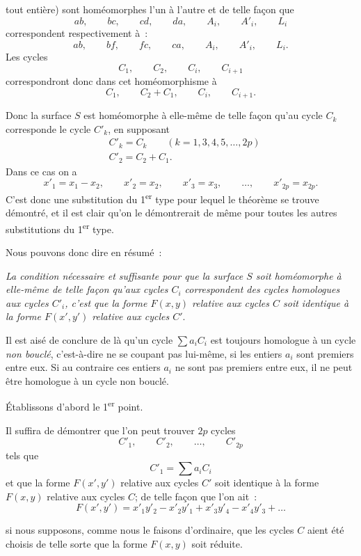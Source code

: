 \documentclass{article}
\begin{document}
tout entière) sont homéomorphes l'un à l'autre et de telle façon que
\[ ab, \qquad bc, \qquad cd, \qquad da, \qquad A_{i}, \qquad A'_{i}, \qquad L_{i} \]
correspondent respectivement à~:
\[ ab, \qquad bf, \qquad fc, \qquad ca, \qquad A_{i}, \qquad A'_{i}, \qquad L_{i}. \]
Les cycles
\[ C_{1}, \qquad C_{2}, \qquad C_{i}, \qquad C_{i+1} \]
correspondront donc dans cet homéomorphisme à
\[ C_{1}, \qquad C_{2} + C_{1}, \qquad C_{i}, \qquad C_{i+1}. \]

Donc la surface $S$ est homéomorphe à elle-même de telle façon qu'au cycle $C_{k}$ corresponde le cycle $C'_{k}$, en supposant
\[ \begin{aligned} &C'_{k} = C_{k} \qquad (k = 1, 3, 4, 5, \ldots, 2p)\\ &C'_{2} = C_{2} + C_{1}. \end{aligned} \]
Dans ce cas on a
\[ x'_{1} = x_{1} - x_{2}, \qquad x'_{2} = x_{2}, \qquad x'_{3} = x_{3}, \qquad \ldots, \qquad x'_{2p} = x_{2p}. \]
C'est donc une substitution du 1\textsuperscript{er} type pour lequel le théorème se trouve démontré, et il est clair qu'on le démontrerait de même pour toutes les autres substitutions du 1\textsuperscript{er} type.

Nous pouvons donc dire en résumé~:

\emph{La condition nécessaire et suffisante pour que la surface $S$ soit homéomorphe à elle-même de telle façon qu'aux cycles $C_{i}$ correspondent des cycles homologues aux cycles $C'_{i}$, c'est que la forme $F(x, y)$ relative aux cycles $C$ soit identique à la forme $F(x', y')$ relative aux cycles $C'$}.

Il est aisé de conclure de là qu'un cycle $\displaystyle\sum a_{i} C_{i}$ est toujours homologue à un cycle \emph{non bouclé}, c'est-à-dire ne se coupant pas lui-même, si les entiers $a_{i}$ sont premiers entre eux. Si au contraire ces entiers $a_{i}$ ne sont pas premiers entre eux, il ne peut être homologue à un cycle non bouclé.

Établissons d'abord le 1\textsuperscript{er} point.

Il suffira de démontrer que l'on peut trouver $2p$ cycles
\[ C'_{1}, \qquad C'_{2}, \qquad \ldots, \qquad C'_{2p} \]
tels que
\[ C'_{1} = \sum a_{i} C_{i} \]
et que la forme $F(x', y')$ relative aux cycles $C'$ soit identique à la forme $F(x, y)$ relative aux cycles $C$; de telle façon que l'on ait~:
\[ F(x', y') = x'_{1}y'_{2} - x'_{2}y'_{1} + x'_{3}y'_{4} - x'_{4}y'_{3} + \ldots \]

si nous supposons, comme nous le faisons d'ordinaire, que les cycles $C$ aient été choisis de telle sorte que la forme $F(x, y)$ soit réduite.
\end{document}
